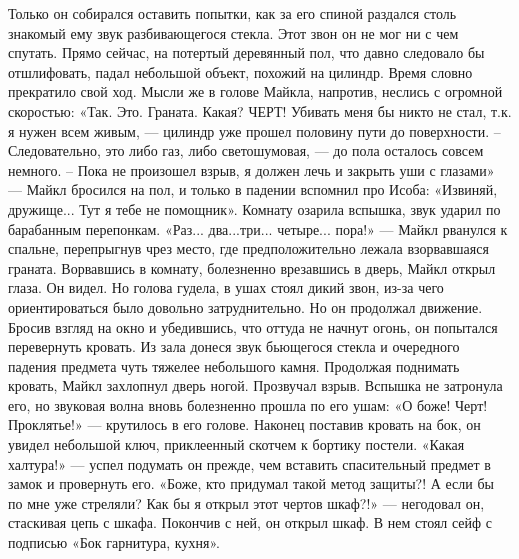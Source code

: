 Только он собирался оставить попытки, как за его спиной раздался столь знакомый ему звук разбивающегося стекла. Этот звон он не мог ни с чем спутать. Прямо сейчас, на потертый деревянный пол, что давно следовало бы отшлифовать, падал небольшой объект, похожий на цилиндр. Время словно прекратило свой ход. Мысли же в голове Майкла, напротив, неслись с огромной скоростью: «Так. Это. Граната. Какая? ЧЕРТ! Убивать меня бы никто не стал, т.к. я нужен всем живым, — цилиндр уже прошел половину пути до поверхности. – Следовательно, это либо газ, либо светошумовая, — до пола осталось совсем немного. – Пока не произошел взрыв, я должен лечь и закрыть уши с глазами» — Майкл бросился на пол, и только в падении вспомнил про Исоба: «Извиняй, дружище... Тут я тебе не помощник». Комнату озарила вспышка, звук ударил по барабанным перепонкам. «Раз... два...три... четыре... пора!» — Майкл рванулся к спальне, перепрыгнув чрез место, где предположительно лежала взорвавшаяся граната. Ворвавшись в комнату, болезненно врезавшись в дверь, Майкл открыл глаза. Он видел. Но голова гудела, в ушах стоял дикий звон, из-за чего ориентироваться было довольно затруднительно. Но он продолжал движение. Бросив взгляд на окно и убедившись, что оттуда не начнут огонь, он попытался перевернуть кровать. Из зала донеся звук бьющегося стекла и очередного падения предмета чуть тяжелее небольшого камня. Продолжая поднимать кровать, Майкл захлопнул дверь ногой. Прозвучал взрыв. Вспышка не затронула его, но звуковая волна вновь болезненно прошла по его ушам: «О боже! Черт! Проклятье!» — крутилось в его голове. Наконец поставив кровать на бок, он увидел небольшой ключ, приклеенный скотчем к бортику постели. «Какая халтура!» — успел подумать он прежде, чем вставить спасительный предмет в замок и провернуть его. «Боже, кто придумал такой метод защиты?! А если бы по мне уже стреляли? Как бы я открыл этот чертов шкаф?!» — негодовал он, стаскивая цепь с шкафа. Покончив с ней, он открыл шкаф. В нем стоял сейф с подписью «Бок гарнитура, кухня». 

